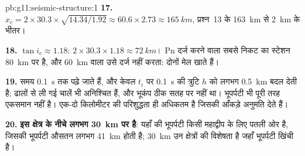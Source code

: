 \begin{solution}{pb:g11:seismic-structure:1}
\textbf{17.} $x_c = 2 \times 30.3 \times \sqrt{14.34/1.92} \approx 60.6 \times
2.73 \approx \qty{165}{km}$, प्रश्न~13 के \qty{163}{km} से
\qty{2}{km} के भीतर।

\textbf{18.} $\tan i_c \approx 1.18$: $2 \times 30.3 \times 1.18 \approx
\qty{72}{km}$। Pn दर्ज करने वाला सबसे निकट का स्टेशन \qty{80}{km} पर है, और
\qty{60}{km} वाला उसे दर्ज नहीं करता: दोनों मेल खाते हैं।

\textbf{19.} समय \qty{0.1}{s} तक पढ़े जाते हैं, और केवल $t_i$ पर
\qty{0.1}{s} की त्रुटि $h$ को लगभग \qty{0.5}{km} बदल देती है; ढालों से
ली गई चालें भी अनिश्चित हैं, और भूकंप ठीक सतह पर नहीं
था। भूपर्पटी भी पूरी तरह एकसमान नहीं है। एक-दो किलोमीटर की परिशुद्धता ही
अधिकतम है जिसकी आँकड़े अनुमति देते हैं।

\textbf{20.} \textbf{इस क्षेत्र के नीचे  लगभग \qty{30}{km} पर है}:
यहाँ की भूपर्पटी किसी महाद्वीप के लिए पतली ओर है, जिसकी भूपर्पटी औसतन लगभग
\qty{41}{km} होती है; \qty{30}{km} उन क्षेत्रों की विशेषता है जहाँ भूपर्पटी
खिंची है।
\end{solution}
